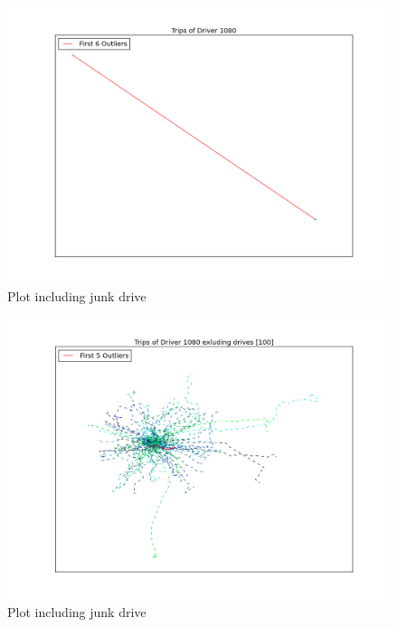 \documentclass{vldb}
\begin{document}
\begin{figure}
\centering
\includegraphics[width=\linewidth]{"pics/outliers_junk/D_1080_unclean"}
\caption{Plot including junk drive}
\label{fig:junk-drive}
\end{figure}

\begin{figure}
\centering
\includegraphics[width=\linewidth]{"pics/outliers_junk/D_1080_clean"}
\caption{Plot including junk drive}
\label{fig:junk-drive}
\end{figure}
\end{document}
